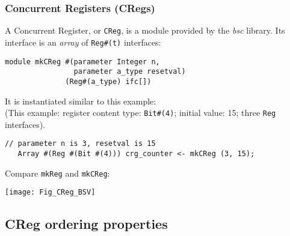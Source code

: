\begin{frame}[fragile]
\frametitle{Concurrent Registers (CRegs)}

\label{slide_cregs_BSV}

\footnotesize

A Concurrent Register, or \verb|CReg|, is a module provided by
 the \emph{bsc} library.  Its interface is an \emph{array}
 of \verb|Reg#(t)| interfaces:

\begin{Verbatim}[frame=single]
module mkCReg #(parameter Integer n,
                parameter a_type resetval)
              (Reg#(a_type) ifc[])
\end{Verbatim}

\vspace{2ex}

It is instantiated similar to this example: \\
(This example: register content type: \verb|Bit#(4)|; initial value: 15; three {\tt Reg} interfaces).

\begin{Verbatim}[frame=single]
   // parameter n is 3, resetval is 15
   Array #(Reg #(Bit #(4))) crg_counter <- mkCReg (3, 15);
\end{Verbatim}

\vspace{2ex}

Compare {\tt mkReg} and {\tt mkCReg}: \hmm
\begin{minipage}{0.5\textwidth}
 \texttt{[image: Fig\_CReg\_BSV]}
\end{minipage}

\end{frame}


\subsection{CReg ordering properties}

